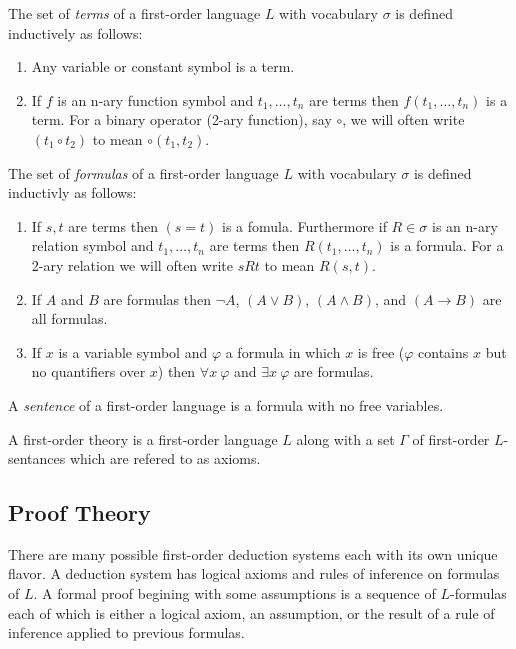 \documentclass[12pt]{article}
\newenvironment{definition}[1][Definition:]{\begin{trivlist}
\item[\hskip \labelsep {\bfseries #1}]}{\end{trivlist}}
\theoremstyle{theorem}
\theoremstyle{definition}
\theoremstyle{definition}
\theoremstyle{remark}
\theoremstyle{definition}
\theoremstyle{remark}
\begin{document}
\begin{definition}
The set of \textit{terms} of a first-order language $L$ with vocabulary $\sigma$ is defined inductively as follows:
\begin{enumerate}
\item Any variable or constant symbol is a term.
\item If $f$ is an n-ary function symbol and $t_1, \dots, t_n$ are terms then $f(t_1, \dots, t_n)$ is a term. For a binary operator (2-ary function), say $\circ$, we will often write $(t_1 \circ t_2)$ to mean $\circ(t_1, t_2)$. 
\end{enumerate} 
\end{definition}

\begin{definition}
The set of \textit{formulas} of a first-order language $L$ with vocabulary $\sigma$ is defined inductivly as follows:
\begin{enumerate}
\item If $s,t$ are terms then $(s = t)$ is a fomula. Furthermore if $R \in \sigma$ is an n-ary relation symbol and $t_1, \dots, t_n$ are terms then $R(t_1, \dots, t_n)$ is a formula. For a 2-ary relation we will often write $s R t$ to mean $R(s, t)$. 
\item If $A$ and $B$ are formulas then $\neg A$, $(A \vee B)$, $(A \wedge B)$, and $(A \to B)$ are all formulas.
\item If $x$ is a variable symbol and $\varphi$ a formula in which $x$ is free ($\varphi$ contains $x$ but no quantifiers over $x$) then $\forall x \: \varphi$ and $\exists x \: \varphi$ are formulas. 
\end{enumerate}
\end{definition}

\begin{definition}
A \textit{sentence} of a first-order language is a formula with no free variables.  
\end{definition}

\begin{definition}
A first-order theory is a first-order language $L$ along with a set $\Gamma$ of first-order $L$-sentances which are refered to as axioms. 
\end{definition}

\subsection{Proof Theory}

There are many possible first-order deduction systems each with its own unique flavor. A deduction system has logical axioms and rules of inference on formulas of $L$. A formal proof begining with some assumptions is a sequence of $L$-formulas each of which is either a logical axiom, an assumption, or the result of a rule of inference applied to previous formulas.  
\end{document}
